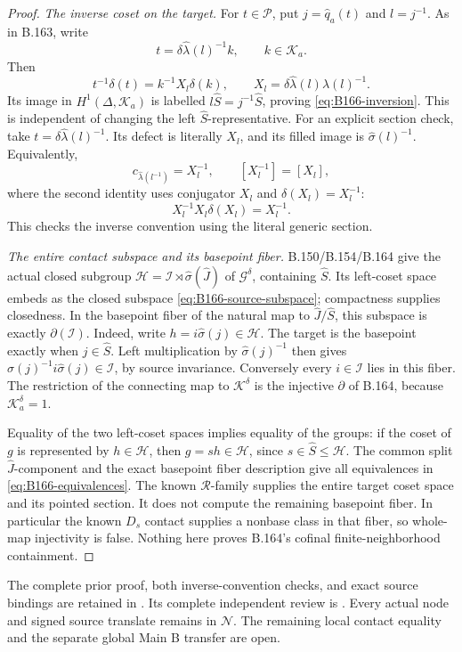 \begin{proof}
\emph{The inverse coset on the target.}
For \(t\in\mathcal P\), put \(j=\widehat q_a(t)\) and \(l=j^{-1}\).
As in B.163, write
\[
 t=\delta\widehat\lambda(l)^{-1}k,\qquad k\in\mathcal K_a.
\]
Then
\[
 t^{-1}\delta(t)=k^{-1}X_l\delta(k),
 \qquad X_l=\delta\widehat\lambda(l)\widehat\lambda(l)^{-1}.
\]
Its image in \(H^1(\Delta,\mathcal K_a)\) is labelled
\(l\widehat S=j^{-1}\widehat S\), proving
\eqref{eq:B166-inversion}. This is independent of changing the
left \(\widehat S\)-representative.
For an explicit section check, take
\(t=\delta\widehat\lambda(l)^{-1}\). Its defect is literally
\(X_l\), and its filled image is \(\widehat\sigma(l)^{-1}\).
Equivalently,
\[
 c_{\widehat\lambda(l^{-1})}=X_l^{-1},
 \qquad [X_l^{-1}]=[X_l],
\]
where the second identity uses conjugator \(X_l\) and
\(\delta(X_l)=X_l^{-1}\):
\[
                  X_l^{-1}X_l\delta(X_l)=X_l^{-1}.
\]
This checks the inverse convention using the literal generic section.

\emph{The entire contact subspace and its basepoint fiber.}
B.150/B.154/B.164 give the actual closed subgroup
\(\mathcal H=\mathcal I\rtimes\widehat\sigma(\widehat J)\)
of \(\mathcal G^\delta\), containing \(\widehat S\).
Its left-coset space embeds as the closed subspace
\eqref{eq:B166-source-subspace}; compactness supplies closedness.
In the basepoint fiber of the natural map to
\(\widehat J/\widehat S\), this subspace is exactly
\(\partial(\mathcal I)\).
Indeed, write \(h=i\widehat\sigma(j)\in\mathcal H\).
The target is the basepoint exactly when \(j\in\widehat S\).
Left multiplication by \(\widehat\sigma(j)^{-1}\) then gives
\(\widehat\sigma(j)^{-1}i\widehat\sigma(j)\in\mathcal I\),
by source invariance. Conversely every \(i\in\mathcal I\)
lies in this fiber. The restriction of the connecting map to
\(\mathcal K^\delta\) is the injective \(\partial\) of B.164,
because \(\mathcal K_a^\delta=1\).

Equality of the two left-coset spaces implies equality of the groups:
if the coset of \(g\) is represented by \(h\in\mathcal H\), then
\(g=sh\in\mathcal H\), since \(s\in\widehat S\le\mathcal H\).
The common split \(\widehat J\)-component and the exact basepoint
fiber description give all equivalences in
\eqref{eq:B166-equivalences}.
The known \(\mathcal R\)-family supplies the entire target coset
space and its pointed section. It does not compute the remaining
basepoint fiber. In particular the known \(D_s\) contact supplies
a nonbase class in that fiber, so whole-map injectivity is false.
Nothing here proves B.164's cofinal finite-neighborhood containment.
\end{proof}

\begingroup\footnotesize\raggedright
The complete prior proof, both inverse-convention checks, and exact
source bindings are retained in
.
Its complete independent review is
.
Every actual node and signed source translate remains in
\(\mathcal N\). The remaining local contact equality and the
separate global Main B transfer are open.
\par\endgroup
